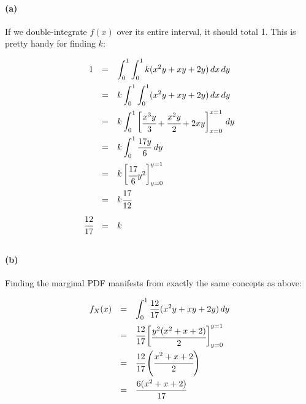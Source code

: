 \documentclass[a4paper]{article}
\begin{document}
\paragraph{(a)} If we double-integrate $f(x)$ over its entire interval, it should total 1. This is pretty handy for finding $k$:

\begin{equation}
\begin{array}{rcl}
1 & = & \displaystyle\int^{1}_{0} \displaystyle\int^{1}_{0} k (x^2y + xy + 2y) \,dx \,dy \\[.15in]
& = & k \displaystyle\int^{1}_{0} \displaystyle\int^{1}_{0} (x^2y + xy + 2y) \,dx \,dy \\[.15in]
& = & k \displaystyle\int^{1}_{0} \begin{bmatrix} \cfrac{x^3y}{3} + \cfrac{x^2y}{2} + 2xy \end{bmatrix}^{x = 1}_{x = 0} \,dy \\[.15in]
& = & k \displaystyle\int^{1}_{0} \frac{17y}{6} \,dy \\[.15in]
& = & k \begin{bmatrix} \cfrac{17}{6} y^2 \end{bmatrix}^{y = 1}_{y = 0} \\[.15in]
& = & k \cfrac{17}{12} \\[.15in]
\cfrac{12}{17} & = & k \\[.15in]
\end{array}
\end{equation}

\paragraph{(b)} Finding the marginal PDF manifests from exactly the same concepts as above:

\begin{equation}
\begin{array}{rcl}
f_{X}(x) & = & \displaystyle\int^{1}_{0} \frac{12}{17} (x^2y + xy + 2y) \,dy \\[.15in]
& = & \cfrac{12}{17} \begin{bmatrix} \cfrac{y^2 (x^2 + x + 2)}{2} \end{bmatrix}^{y = 1}_{y = 0} \\[.15in]
& = & \cfrac{12}{17} \left( \cfrac{x^2 + x + 2}{2} \right) \\[.17in]
& = & \cfrac{6(x^2 + x + 2)}{17} \\[.15in]
\end{array}
\end{equation}
\end{document}
